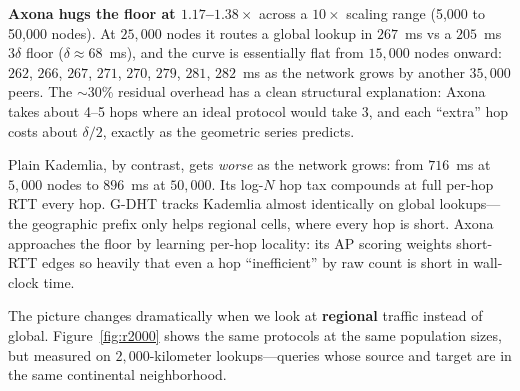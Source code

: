 \documentclass[nobib,justified]{tufte-handout}
\begin{document}
\textbf{Axona hugs the floor at $1.17$--$1.38\times$} across a $10\times$ scaling range (5{,}000 to 50{,}000 nodes). At $25{,}000$ nodes it routes a global lookup in $267$~ms vs a $205$~ms $3\delta$ floor ($\delta \approx 68$~ms), and the curve is essentially flat from $15{,}000$ nodes onward: $262$, $266$, $267$, $271$, $270$, $279$, $281$, $282$~ms as the network grows by another $35{,}000$ peers. The $\sim$30\% residual overhead has a clean structural explanation: Axona takes about 4--5 hops where an ideal protocol would take 3, and each ``extra'' hop costs about $\delta/2$, exactly as the geometric series predicts.

Plain Kademlia, by contrast, gets \emph{worse} as the network grows: from $716$~ms at $5{,}000$ nodes to $896$~ms at $50{,}000$. Its log-$N$ hop tax compounds at full per-hop RTT every hop. G-DHT tracks Kademlia almost identically on global lookups---the geographic prefix only helps regional cells, where every hop is short. Axona approaches the floor by learning per-hop locality: its AP scoring weights short-RTT edges so heavily that even a hop ``inefficient'' by raw count is short in wall-clock time.

\bigskip

The picture changes dramatically when we look at \textbf{regional} traffic instead of global.  Figure~\ref{fig:r2000} shows the same protocols at the same population sizes, but measured on $2{,}000$-kilometer lookups---queries whose source and target are in the same continental neighborhood.
\end{document}
